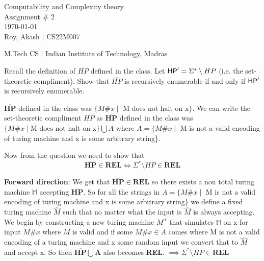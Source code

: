 \documentclass[12pt,a4, onecolumn]{exam}
\begin{document}
\begingroup  
    \centering
    \LARGE Computability and Complexity theory\\
    \LARGE Assignment \# 2\\[0.5em]
    \large \today\\[0.5em]
    \large Roy, Akash $\mid$ CS22M007\par
    \large M.Tech CS $\mid$ Indian Institute of Technology, Madras\par
\endgroup
\pointsdroppedatright   %
\printanswers
\renewcommand{\solutiontitle}{\noindent\textbf{Ans:}\enspace}   %

\begin{questions}

    \question Recall the definition of $\overline{HP}$ defined in the class. Let ${\sf HP}' = \Sigma^* \setminus {HP}$ (i.e. the set-theoretic compliment).  Show that $\overline{HP}$ is recursively enumerable if and only if ${\sf HP}'$ is recursively enumerable.
    
    \begin{solution}
        $\overline{\textbf{HP}}$ defined in the class was $\{M\#x \mid \text{ M does not halt on x}\}$.
        We can write the set-theoretic compliment $HP$ as $\overline{\textbf{HP}}$ defined in the class was $\{M\#x \mid \text{M does not halt on x}\} \bigcup A$
        where $A = \{M\#x \mid$ M is not a valid encoding of turing machine and x is some arbitrary string\}.

        Now from the question we need to show that
        $$
        \overline{\textbf{HP}} \in \textbf{REL} \iff \Sigma^* \setminus {HP} \in \textbf{REL}
        $$

        \textbf{Forward direction}: We get that $\overline{\textbf{HP}} \in \textbf{REL}$ so there exists a non total turing machine $\mathbb{M}$ accepting $\overline{\textbf{HP}}$. So for all the strings in $A = \{M\#x \mid$ M is not a valid encoding of turing machine and x is some arbitrary string\} we define a fixed turing machine $\hat{M}$ such that no matter what the input is $\hat{M}$ is always accepting. 
        We begin by constructing a new turing machine $M^{\alpha}$ that simulates $\mathbb{M}$ on x for input $M\#x$ where $M$ is valid and if some $M\#x \in A$ comes where M is not a valid encoding of a turing machine and x some random input we convert that to $\hat{M}$ and accept x.
        So then $\overline{\textbf{HP}} \bigcup \textbf{A}$ also becomes \textbf{REL}.
        $\implies \Sigma^* \setminus {HP} \in \textbf{REL}$


\end{solution}
\end{questions}
\end{document}
